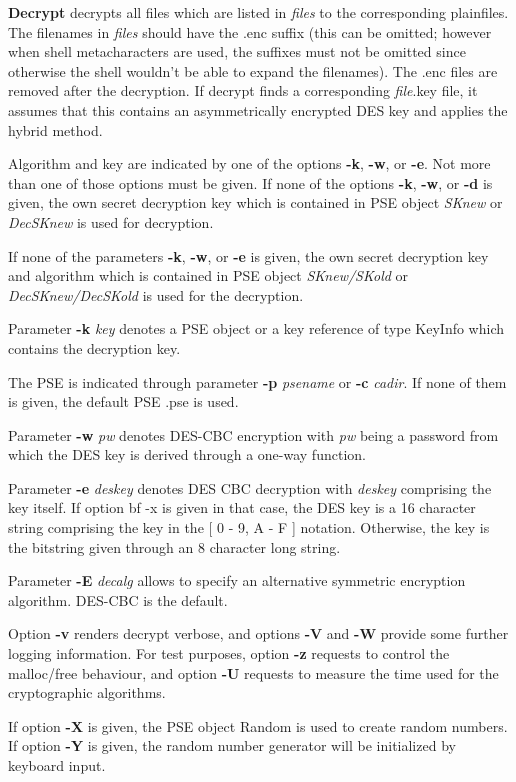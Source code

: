 {\large\bf Decrypt} decrypts all files which are listed in {\em files} to the corresponding
plainfiles. The filenames in {\em files} should have the .enc suffix (this can be omitted;
however when shell metacharacters are used, the suffixes must not be omitted since
otherwise the shell wouldn't be able to expand the filenames). The .enc files are
removed after the decryption. If decrypt
finds a corresponding {\em file}.key file, it assumes that this contains an asymmetrically
encrypted DES key and applies the hybrid method.
 
Algorithm and key are indicated by one of the options 
{\bf -k}, {\bf -w}, or {\bf -e}. Not more than one of those options 
must be given. If none of the options {\bf -k}, {\bf -w}, or {\bf -d} is given, the own
secret decryption key which is contained in PSE object {\em SKnew} or
{\em DecSKnew} is used for decryption. 

If none of the parameters {\bf -k}, {\bf -w}, or {\bf -e} is given, the own secret
decryption key and algorithm which is contained in PSE object {\em SKnew/SKold} or {\em 
DecSKnew/DecSKold}
is used for the decryption.
 
Parameter {\bf -k} {\em key} denotes a PSE object or a key reference of type KeyInfo
which contains the decryption key.
 
The PSE is indicated through parameter {\bf -p} {\em psename} or {\bf -c} {\em cadir}. If none of them
is given, the default PSE .pse is used.

Parameter {\bf -w} {\em pw} denotes DES-CBC encryption with {\em pw} being a password from which the 
DES key 
is derived through a one-way function.
 
Parameter {\bf -e} {\em deskey} denotes DES CBC decryption with {\em deskey} comprising the key itself.
If option {bf -x} is given in that case, the DES key is a 16 character string comprising
the key in the [ 0 - 9, A - F ] notation. Otherwise, the key is the bitstring given through
an 8 character long string.

Parameter {\bf -E} {\em decalg} allows to specify an alternative symmetric encryption algorithm.
DES-CBC is the default.

Option {\bf -v} renders decrypt verbose, and options {\bf -V} and {\bf -W} provide some further logging
information. For test purposes, option {\bf -z} requests
to control the malloc/free behaviour, and option {\bf -U} requests to measure the time used for the 
cryptographic
algorithms.

If option {\bf -X} is given, the PSE object Random
is used to create random numbers.
If option {\bf -Y} is given, the random number generator
will be initialized by keyboard input.
\\ [1em]

